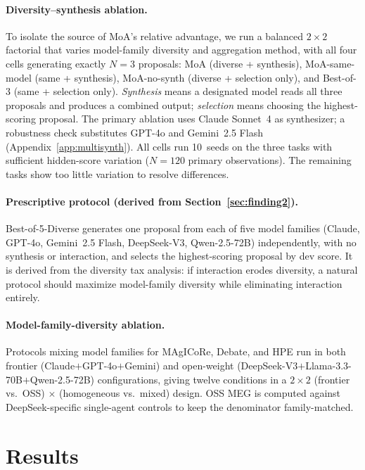 \documentclass{article}
\begin{document}
\paragraph{Diversity--synthesis ablation.}
To isolate the source of MoA's relative advantage, we run a balanced $2{\times}2$ factorial that varies model-family diversity and aggregation method, with all four cells generating exactly $N{=}3$ proposals: MoA (diverse + synthesis), MoA-same-model (same + synthesis), MoA-no-synth (diverse + selection only), and Best-of-3 (same + selection only). \emph{Synthesis} means a designated model reads all three proposals and produces a combined output; \emph{selection} means choosing the highest-scoring proposal. The primary ablation uses Claude Sonnet~4 as synthesizer; a robustness check substitutes GPT-4o and Gemini~2.5 Flash (Appendix~\ref{app:multisynth}). All cells run 10~seeds on the three tasks with sufficient hidden-score variation ($N{=}120$ primary observations). The remaining tasks show too little variation to resolve differences.

\paragraph{Prescriptive protocol (derived from Section~\ref{sec:finding2}).}
Best-of-5-Diverse generates one proposal from each of five model families (Claude, GPT-4o, Gemini~2.5 Flash, DeepSeek-V3, Qwen-2.5-72B) independently, with no synthesis or interaction, and selects the highest-scoring proposal by dev score. It is derived from the diversity tax analysis: if interaction erodes diversity, a natural protocol should maximize model-family diversity while eliminating interaction entirely.

\paragraph{Model-family-diversity ablation.}
Protocols mixing model families for MAgICoRe, Debate, and HPE run in both frontier (Claude$+$GPT-4o$+$Gemini) and open-weight (DeepSeek-V3$+$Llama-3.3-70B$+$Qwen-2.5-72B) configurations, giving twelve conditions in a $2{\times}2$ (frontier vs.\ OSS) $\times$ (homogeneous vs.\ mixed) design. OSS MEG is computed against DeepSeek-specific single-agent controls to keep the denominator family-matched.

\section{Results}
\label{sec:results}
\end{document}
